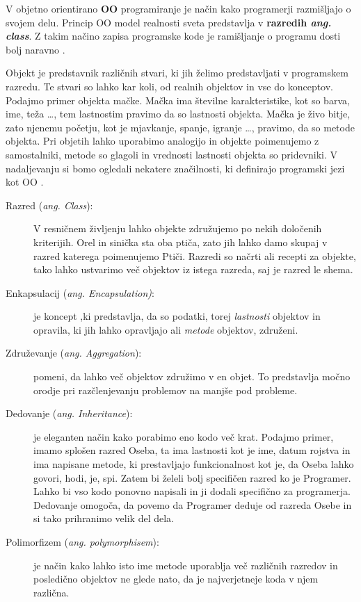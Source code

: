 
V objetno orientirano \textbf{OO} programiranje je način kako
programerji razmišljajo o svojem delu. Princip OO model realnosti
sveta predstavlja v \textbf{razredih \emph{ang. class}}. Z takim
načino zapisa programske kode je ramišljanje o programu dosti bolj
naravno \cite{shaums}.

Objekt je predstavnik različnih stvari, ki jih želimo predstavljati v
programskem razredu. Te stvari so lahko kar koli, od realnih objektov
in vse do konceptov. Podajmo primer objekta mačke. Mačka ima številne
karakteristike, kot so barva, ime, teža \dots, tem lastnostim pravimo
da so lastnosti objekta. Mačka je živo bitje, zato njenemu početju,
kot je mjavkanje, spanje, igranje \dots, pravimo, da so metode
objekta. Pri objetih lahko uporabimo analogijo in objekte poimenujemo
z samostalniki, metode so glagoli in vrednosti lastnosti objekta so
pridevniki. V nadaljevanju si bomo ogledali nekatere značilnosti, ki
definirajo programski jezi kot OO \cite{OO-JS}.

\begin{description}
\item[Razred (\emph{ang. Class}):] V resničnem življenju lahko objekte
  združujemo po nekih določenih kriterijih. Orel in sinička sta oba
  ptiča, zato jih lahko damo skupaj v razred katerega poimenujemo
  Ptiči. Razredi so načrti ali recepti za objekte, tako lahko
  ustvarimo več objektov iz istega razreda, saj je razred le shema.
\item [Enkapsulacij (\emph{ang. Encapsulation)}:] je koncept ,ki
  predstavlja, da so podatki, torej \emph{lastnosti} objektov in
  opravila, ki jih lahko opravljajo ali \emph{metode} objektov,
  združeni.
\item [Združevanje (\emph{ang. Aggregation}):] pomeni, da lahko več
  objektov združimo v en objet. To predstavlja močno orodje pri
  razčlenjevanju problemov na manjše pod probleme.
\item [Dedovanje (\emph{ang. Inheritance}):] je eleganten način kako
  porabimo eno kodo več krat. Podajmo primer, imamo splošen razred
  Oseba, ta ima lastnosti kot je ime, datum rojstva in ima napisane
  metode, ki prestavljajo funkcionalnost kot je, da Oseba lahko
  govori, hodi, je, spi. Zatem bi želeli bolj specifičen razred ko je
  Programer. Lahko bi vso kodo ponovno napisali in ji dodali
  specifično za programerja. Dedovanje omogoča, da povemo da Programer
  deduje od razreda Osebe in si tako prihranimo velik del dela.
\item [Polimorfizem (\emph{ang. polymorphisem}):] je način kako lahko
  isto ime metode uporablja več različnih razredov in posledično
  objektov ne glede nato, da je najverjetneje koda v njem
  različna.
\end{description}

